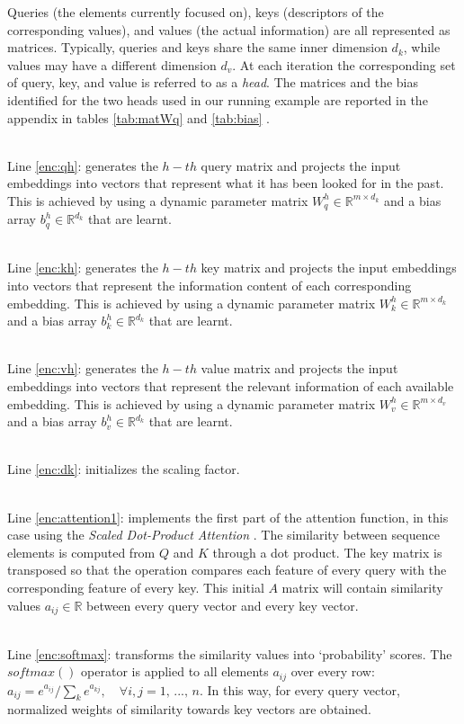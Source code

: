 \documentclass[algorithms,article,submit,pdftex,moreauthors]{Definitions/mdpi}
\begin{document}
Queries (the elements currently focused on), keys (descriptors of the corresponding values), and values (the actual information) are all represented as matrices. Typically, queries and keys share the same inner dimension $d_k$, while values may have a different dimension $d_v$. At each iteration the corresponding set of query, key, and value is referred to as a \textit{head}. The matrices and the bias identified for the two heads used in our running example are reported in the appendix in tables \ref{tab:matWq} and \ref{tab:bias} .

~\\Line \ref{enc:qh}: generates the $h-th$ query matrix and projects the input embeddings into vectors that represent what it has been looked for in the past. This is achieved by using a dynamic parameter matrix $W^h_q \in \mathbb{R}^{m \times d_k}$ and a bias array $b^h_q \in \mathbb{R}^{d_k}$ that are learnt.

~\\Line \ref{enc:kh}: generates the $h-th$ key matrix and projects the input embeddings into vectors that represent the information content of each corresponding embedding. This is achieved by using a dynamic parameter matrix $W^h_k \in \mathbb{R}^{m \times d_k}$ and a bias array $b^h_k \in \mathbb{R}^{d_k}$ that are learnt.

~\\Line \ref{enc:vh}: generates the $h-th$ value matrix and projects the input embeddings into vectors that represent the relevant information of each available embedding. This is achieved by using a dynamic parameter matrix $W^h_v \in \mathbb{R}^{m \times d_v}$ and a bias array $b^h_v \in \mathbb{R}^{d_k}$ that are learnt.

~\\Line \ref{enc:dk}: initializes the scaling factor.

~\\Line \ref{enc:attention1}: implements the first part of the attention function, in this case using the \textit{Scaled Dot-Product Attention} \cite{VSPU17}. The similarity between sequence elements is computed from $Q$ and $K$ through a dot product. The key matrix is transposed so that the operation compares each feature of every query with the corresponding feature of every key. This initial $A$ matrix will contain similarity values $a_{ij} \in \mathbb{R}$ between every query vector and every key vector. 

~\\Line \ref{enc:softmax}: transforms the similarity values into `probability' scores. The $\textit{softmax}()$ operator is applied to all elements $a_{ij}$ over every row: $a_{ij} = e^{a_{ij}} / \sum_k e^{a_{kj}},\quad \forall i,j  = 1,\,...,\,n $. In this way, for every query vector, normalized weights of similarity towards key vectors are obtained. 
\end{document}
